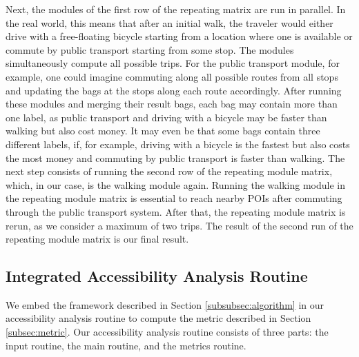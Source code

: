 Next, the modules of the first row of the repeating matrix are run in parallel.
In the real world, this means that after an initial walk, the traveler would either drive with a free-floating bicycle starting from a location where one is available or commute by public transport starting from some stop.
The modules simultaneously compute all possible trips.
For the public transport module, for example, one could imagine commuting along all possible routes from all stops and updating the bags at the stops along each route accordingly.
After running these modules and merging their result bags, each bag may contain more than one label, as public transport and driving with a bicycle may be faster than walking but also cost money.
It may even be that some bags contain three different labels, if, for example, driving with a bicycle is the fastest but also costs the most money and commuting by public transport is faster than walking.
The next step consists of running the second row of the repeating module matrix, which, in our case, is the walking module again.
Running the walking module in the repeating module matrix is essential to reach nearby POIs after commuting through the public transport system.
After that, the repeating module matrix is rerun, as we consider a maximum of two trips.
The result of the second run of the repeating module matrix is our final result.

\subsection{Integrated Accessibility Analysis Routine}
\label{subsec:combining}

We embed the framework described in Section \ref{subsubsec:algorithm} in our accessibility analysis routine to compute the metric described in Section \ref{subsec:metric}.
Our accessibility analysis routine consists of three parts: the input routine, the main routine, and the metrics routine.

